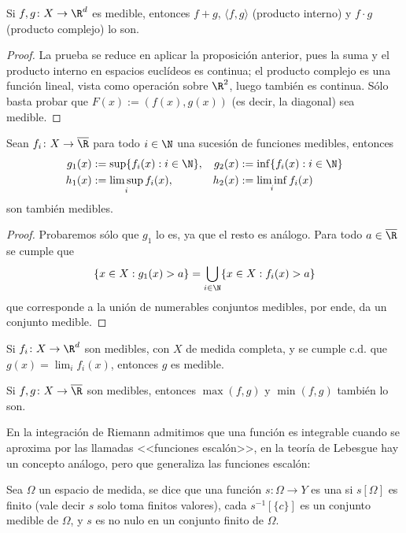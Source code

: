 \begin{prop}
	Si $f,g\colon X \to \R^d$ es medible, entonces $f + g$, $\langle f, g \rangle$ (producto interno) y $f\cdot g$ (producto complejo) lo son.
\end{prop}
\begin{proof}
	La prueba se reduce en aplicar la proposición anterior, pues la suma y el producto interno en espacios euclídeos es continua; el producto complejo es una función lineal, vista como operación sobre $\R^2$, luego también es continua.
	Sólo basta probar que $F(x) := (f(x), g(x))$ (es decir, la diagonal) sea medible.
\end{proof}


\begin{thm}
	Sean $f_i\colon X \to \overline\R$ para todo $i\in\N$ una sucesión de funciones medibles, entonces
	\begin{align*}
		g_1(x) &:= \sup\{f_i(x):i\in\N\}, & g_2(x) &:= \inf\{f_i(x):i\in\N\} \\
		h_1(x) &:= \limsup_i f_i(x),      & h_2(x) &:= \liminf_i f_i(x)
	\end{align*}
	son también medibles.
\end{thm}
\begin{proof}
	Probaremos sólo que $g_1$ lo es, ya que el resto es análogo.
	Para todo $a\in\overline\R$ se cumple que
	$$ \{x\in X:g_1(x) > a\} = \bigcup_{i\in\N} \{x\in X:f_i(x) > a\} $$
	que corresponde a la unión de numerables conjuntos medibles, por ende, da un conjunto medible.
\end{proof}

\begin{cor}
	Si $f_i\colon X\to\R^d$ son medibles, con $X$ de medida completa, y se cumple c.d. que $g(x) = \lim_i f_i(x)$, entonces $g$ es medible.
\end{cor}

\begin{cor}
	Si $f,g\colon X\to\overline\R$ son medibles, entonces $\max(f,g)$ y $\min(f,g)$ también lo son.
\end{cor}

En la integración de Riemann admitimos que una función es integrable cuando se aproxima por las llamadas <<funciones escalón>>,
en la teoría de Lebesgue hay un concepto análogo, pero que generaliza las funciones escalón:
\begin{mydefi}
	Sea $\Omega$ un espacio de medida, se dice que una función $s\colon \Omega \to Y$ es una  si
	$s[\Omega]$ es finito (vale decir $s$ solo toma finitos valores), cada $s^{-1}[\{c\}]$ es un conjunto medible de $\Omega$,
	y $s$ es no nulo en un conjunto finito de $\Omega$.
\end{mydefi}


